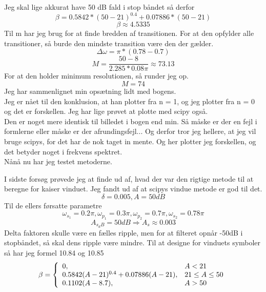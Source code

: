 \begin{Øvelser}
\begin{kapitel}
\begin{Øvelse}
            Jeg skal lige akkurat have 50 dB fald i stop båndet så derfor 
            \[\beta = 0.5842 * (50 - 21)^0.4 + 0.07886*(50 - 21)\]
            \[\beta \approx 4.5335\]
            Til m har jeg brug for at finde bredden af transitionen. For at den opfylder alle transitioner, så burde den mindste transition være den der gælder. \\
            \[\Delta \omega = \pi*(0.78 - 0.7)\]
            \[M = \frac{50 - 8}{2.285 * 0.08\pi} \approx 73.13\]
            For at den holder minimum resolutionen, så runder jeg op.
            \[M = 74\]
            Jeg har sammenlignet min opsætning lidt med bogens. 
            \\
            Jeg er nået til den konklusion, at han plotter fra n = 1, og jeg plotter fra n = 0 og det er forskellen. 
            Jeg har lige prøvet at plotte med scipy også. 
            \\
            Den er noget mere identisk til billedet i bogen end min. Så måske er der en fejl i formlerne eller måske er der afrundingsfejl...
            Og derfor tror jeg hellere, at jeg vil bruge scipys, for det har de nok taget in mente.
            Og her plotter jeg forskellen, og det betyder noget i frekvens spektret.
            \\
            Nånå nu har jeg testet metoderne.
        \end{Øvelse}
        \clearpage
        \begin{Øvelse}
            I sidste forsøg prøvede jeg at finde ud af, hvad der var den rigtige metode til at beregne for kaiser vinduet. 
            Jeg fandt ud af at scipys vindue metode er god til det. 
            \[\delta = 0.005, A = 50dB\]
            Til de ellers førsatte parametre 
            \[\omega_{s_1} = 0.2\pi, \omega_{p_1} = 0.3\pi, \omega_{p_2} = 0.7\pi, \omega_{s_2} = 0.78\pi\]
            \[A_{s_dB}= 50dB \Rightarrow A_s \approx 0.003\]
            Delta faktoren skulle være en fælles ripple, men for at filteret opnår -50dB i stopbåndet, så skal dens ripple være mindre.
            Til at designe for vinduets symboler så har jeg formel 10.84 og 10.85
            \[\beta=\left\{\begin{array}{l l}{{0,}}&{{A<21}}\\ {{0.5842(A-21)^{0.4}+0.07886(A-21),}}&{{21\leq A\leq50}}\\ {{0.1102(A-8.7),}}&{{A>50}}\end{array}\right.\]

\end{Øvelse}
\end{kapitel}
\end{Øvelser}
